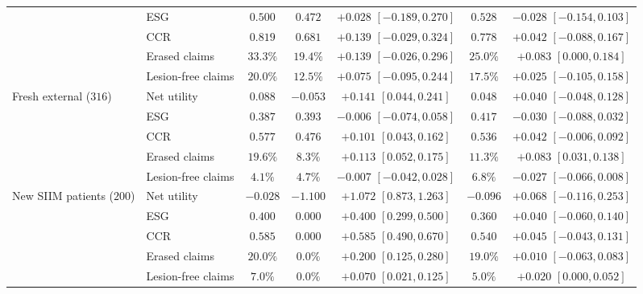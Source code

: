 \documentclass[5p,times,twocolumn,authoryear]{elsarticle}
\begin{document}
\begin{table}[!htbp]
\begin{center}
\begin{adjustbox}{max width=\linewidth}
\begin{tabular}{llccccc}
 & ESG & $0.500$ & $0.472$ & $+0.028$ $[-0.189, 0.270]$ & $0.528$ & $-0.028$ $[-0.154, 0.103]$ \\
 & CCR & $0.819$ & $0.681$ & $+0.139$ $[-0.029, 0.324]$ & $0.778$ & $+0.042$ $[-0.088, 0.167]$ \\
 & Erased claims & $33.3\%$ & $19.4\%$ & $+0.139$ $[-0.026, 0.296]$ & $25.0\%$ & $+0.083$ $[0.000, 0.184]$ \\
 & Lesion-free claims & $20.0\%$ & $12.5\%$ & $+0.075$ $[-0.095, 0.244]$ & $17.5\%$ & $+0.025$ $[-0.105, 0.158]$ \\
\midrule
Fresh external ($316$) & Net utility & $0.088$ & $-0.053$ & $\mathbf{+0.141}$ $\mathbf{[0.044, 0.241]}$ & $0.048$ & $+0.040$ $[-0.048, 0.128]$ \\
 & ESG & $0.387$ & $0.393$ & $-0.006$ $[-0.074, 0.058]$ & $0.417$ & $-0.030$ $[-0.088, 0.032]$ \\
 & CCR & $0.577$ & $0.476$ & $\mathbf{+0.101}$ $\mathbf{[0.043, 0.162]}$ & $0.536$ & $+0.042$ $[-0.006, 0.092]$ \\
 & Erased claims & $19.6\%$ & $8.3\%$ & $\mathbf{+0.113}$ $\mathbf{[0.052, 0.175]}$ & $11.3\%$ & $\mathbf{+0.083}$ $\mathbf{[0.031, 0.138]}$ \\
 & Lesion-free claims & $4.1\%$ & $4.7\%$ & $-0.007$ $[-0.042, 0.028]$ & $6.8\%$ & $-0.027$ $[-0.066, 0.008]$ \\
\midrule
New SIIM patients ($200$) & Net utility & $-0.028$ & $-1.100$ & $\mathbf{+1.072}$ $\mathbf{[0.873, 1.263]}$ & $-0.096$ & $+0.068$ $[-0.116, 0.253]$ \\
 & ESG & $0.400$ & $0.000$ & $\mathbf{+0.400}$ $\mathbf{[0.299, 0.500]}$ & $0.360$ & $+0.040$ $[-0.060, 0.140]$ \\
 & CCR & $0.585$ & $0.000$ & $\mathbf{+0.585}$ $\mathbf{[0.490, 0.670]}$ & $0.540$ & $+0.045$ $[-0.043, 0.131]$ \\
 & Erased claims & $20.0\%$ & $0.0\%$ & $\mathbf{+0.200}$ $\mathbf{[0.125, 0.280]}$ & $19.0\%$ & $+0.010$ $[-0.063, 0.083]$ \\
 & Lesion-free claims & $7.0\%$ & $0.0\%$ & $\mathbf{+0.070}$ $\mathbf{[0.021, 0.125]}$ & $5.0\%$ & $+0.020$ $[0.000, 0.052]$ \\
\bottomrule
\end{tabular}
\end{adjustbox}
\end{center}
\end{table}
\end{document}
